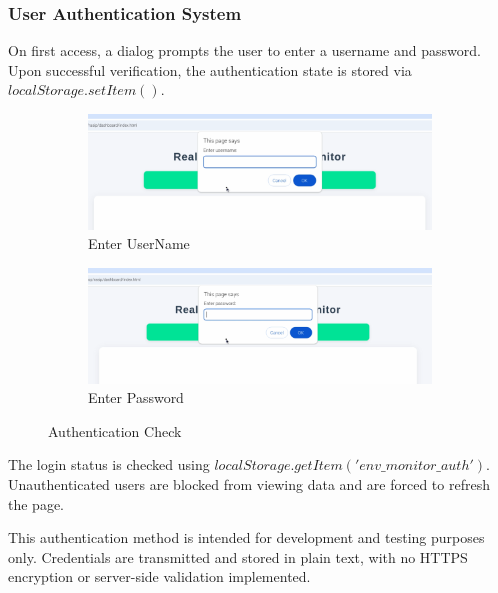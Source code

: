 \documentclass[12pt,a4paper]{article}
\begin{document}
\subsubsection{User Authentication System}

On first access, a dialog prompts the user to enter a username and password. Upon successful verification, the authentication state is stored via $localStorage.setItem()$.

\begin{figure}[h!]
  \centering
  \begin{subfigure}[b]{0.45\textwidth}
      \includegraphics[width=\textwidth]{figures/userName.png}
      \caption{Enter UserName}
      \label{fig:twoimg1}
  \end{subfigure}
  \hfill
  \begin{subfigure}[b]{0.45\textwidth}
      \includegraphics[width=\textwidth]{figures/pw.png}
      \caption{Enter Password}
      \label{fig:twoimg2}
  \end{subfigure}
  \caption{Authentication Check}
  \label{fig:twoimageset}
\end{figure}

\vspace{\baselineskip}
\noindent
The login status is checked using $localStorage.getItem('env\_monitor\_auth')$. Unauthenticated users are blocked from viewing data and are forced to refresh the page.

\vspace{\baselineskip}
\noindent
This authentication method is intended for development and testing purposes only. Credentials are transmitted and stored in plain text, with no HTTPS encryption or server-side validation implemented.
\end{document}
